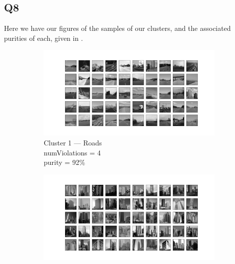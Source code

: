 \documentclass{article}
\theoremstyle{definition}
\begin{document}
    \subsection*{Q8}
        Here we have our figures of the samples of our clusters, 
        and the associated purities of each, given in .
        \begin{figure}
            \begin{subfigure}{\textwidth}
              \begin{minipage}[c]{0.67\textwidth}
                \includegraphics[width=\textwidth]{figures/q7_b_1.png}
              \end{minipage}\hfill
              \begin{minipage}[c]{0.3\textwidth}
                \caption{
                    Cluster 1 --- Roads \\
                    numViolations = 4 \\
                    purity = 92\%
                } \label{fig:}
              \end{minipage}
            \end{subfigure}
            \begin{subfigure}{\textwidth}
              \begin{minipage}[c]{0.67\textwidth}
                \includegraphics[width=\textwidth]{figures/q7_b_2.png}

\end{minipage}
\end{subfigure}
\end{figure}
\end{document}
